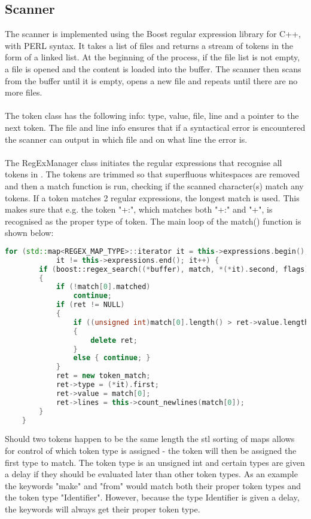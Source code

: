 \subsection{Scanner}
The scanner is implemented using the Boost regular expression library for C++, with PERL syntax. It takes a list of files and returns a stream of tokens in the form of a linked list. At the beginning of the process, if the file list is not empty, a file is opened and the content is loaded into the buffer. The scanner then scans from the buffer until it is empty, opens a new file and repeats until there are no more files.\\
\\
The token class has the following info: type, value, file, line and a pointer to the next token. The file and line info ensures that if a syntactical error is encountered the scanner can output in which file and on what line the error is. \\
\\
The RegExManager class initiates the regular expressions that recognise all tokens in \langname{}. The tokens are trimmed so that superfluous whitespaces are removed and then a match function is run, checking if the scanned character(s) match any tokens. If a token matches 2 regular expressions, the longest match is used. This makes sure that e.g. the token "+:", which matches both "+:" and "+", is recognised as the proper type of token. The main loop of the match() function is shown below:

\begin{lstlisting}[language = c++]
	for (std::map<REGEX_MAP_TYPE>::iterator it = this->expressions.begin();
			it != this->expressions.end(); it++) {
		if (boost::regex_search((*buffer), match, *(*it).second, flags))
		{
			if (!match[0].matched)
				continue;
			if (ret != NULL)
			{
				if ((unsigned int)match[0].length() > ret->value.length())
				{
					delete ret;
				}
				else { continue; }
			}
			ret = new token_match;
			ret->type = (*it).first;
			ret->value = match[0];
			ret->lines = this->count_newlines(match[0]);
		}
	}
\end{lstlisting}

Should two tokens happen to be the same length the \ac{stl} sorting of maps allows for control of which token type is assigned - the token will then be assigned the first type to match. The token type is an unsigned int and certain types are given a delay if they should be evaluated later than other token types. As an example the keywords "make" and "from" would match both their proper token types and the token type "Identifier". However, because the type Identifier is given a delay, the keywords will always get their proper token type.

